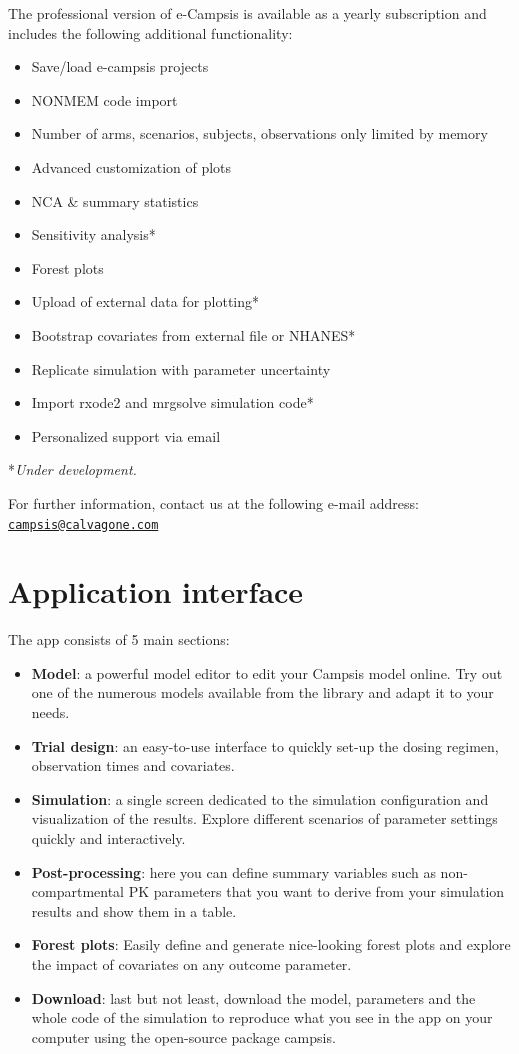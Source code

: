 \documentclass[
]{book}
\providecommand{\tightlist}{%
  \setlength{\itemsep}{0pt}\setlength{\parskip}{0pt}}
\begin{document}
The professional version of e-Campsis is available as a yearly subscription and includes the following additional functionality:

\begin{itemize}
\tightlist
\item
  Save/load e-campsis projects
\item
  NONMEM code import
\item
  Number of arms, scenarios, subjects, observations only limited by memory
\item
  Advanced customization of plots
\item
  NCA \& summary statistics
\item
  Sensitivity analysis*
\item
  Forest plots
\item
  Upload of external data for plotting*
\item
  Bootstrap covariates from external file or NHANES*
\item
  Replicate simulation with parameter uncertainty
\item
  Import rxode2 and mrgsolve simulation code*
\item
  Personalized support via email
\end{itemize}

*\emph{Under development.}

For further information, contact us at the following e-mail address: \href{mailto:campsis@calvagone.com}{\nolinkurl{campsis@calvagone.com}}

\section{Application interface}\label{application-interface}

The app consists of 5 main sections:

\begin{itemize}
\tightlist
\item
  \textbf{Model}: a powerful model editor to edit your Campsis model online. Try out one of the numerous models available from the library and adapt it to your needs.
\item
  \textbf{Trial design}: an easy-to-use interface to quickly set-up the dosing regimen, observation times and covariates.
\item
  \textbf{Simulation}: a single screen dedicated to the simulation configuration and visualization of the results. Explore different scenarios of parameter settings quickly and interactively.
\item
  \textbf{Post-processing}: here you can define summary variables such as non-compartmental PK parameters that you want to derive from your simulation results and show them in a table.
\item
  \textbf{Forest plots}: Easily define and generate nice-looking forest plots and explore the impact of covariates on any outcome parameter.
\item
  \textbf{Download}: last but not least, download the model, parameters and the whole code of the simulation to reproduce what you see in the app on your computer using the open-source package campsis.
\end{itemize}
\end{document}
